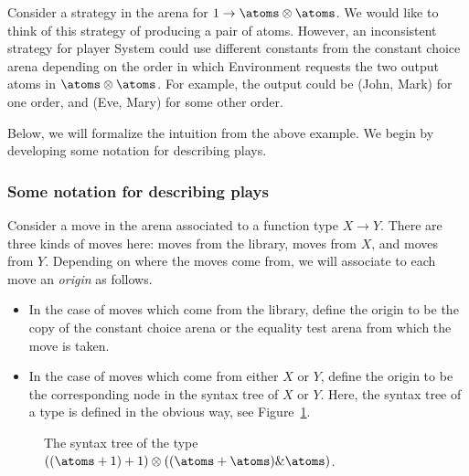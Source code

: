 \begin{example} \label{ex:inconsistent-strategy} Consider a strategy in the arena for  $1 \to \atoms \otimes \atoms$. We would like to think of this strategy of producing a pair of atoms. 
     However, an inconsistent strategy for player System could use different constants from the constant choice arena  depending on the order in which Environment requests the two output atoms in $\atoms \otimes \atoms$.  For example, the output could be (John, Mark) for one order, and (Eve, Mary) for some other order.  \exampleend
\end{example}

Below, we will formalize the intuition from the above example. We begin by developing some notation for describing plays.





\subsubsection{Some notation for describing plays}
\label{sec:some-notation-for-describing-plays}
Consider a move in the arena associated to a function type $X \to Y$. There are three kinds of moves here: moves from the library, moves from $X$, and moves from $Y$. Depending on where the moves come from, we will associate to each move an \emph{origin} as follows. 
\begin{itemize}
    \item In the case of moves which come from the library, define the  {origin} to be the copy of the constant choice arena or the equality test arena from which the move is taken.
    \item   In the case of moves which come from either $X$ or $Y$, define the origin to be the corresponding node in the syntax tree of $X$ or $Y$. Here, the syntax tree of a type is defined in the obvious way, see Figure~\ref{fig:syntax-tree}.
\end{itemize}


\begin{figure}
    \caption{\label{fig:syntax-tree} The syntax tree of the type $((\atoms +1) + 1) \otimes ((\atoms + \atoms) \& \atoms)$.}
\end{figure}


